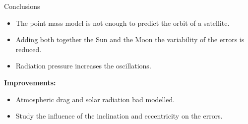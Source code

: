 \documentclass{beamer} %
\begin{document}
\begin{frame}{Conclusions}
  \begin{itemize}
    \item The point mass model is not enough to predict the orbit of a satellite.
    \item Adding both together the Sun and the Moon the variability of the errors is reduced.
    \item Radiation pressure increases the oscillations.
  \end{itemize}
  \textbf{Improvements:}
  \begin{itemize}
    \item Atmospheric drag and solar radiation bad modelled.
    \item Study the influence of the inclination and eccentricity on the errors.
  \end{itemize}
\end{frame}
\end{document}
